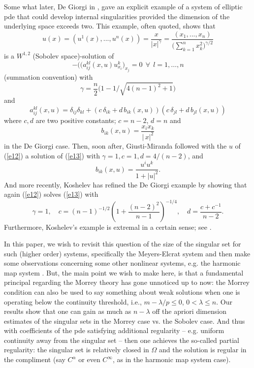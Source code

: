 \documentclass[12pt]{amsart}
\begin{document}
Some what later, De Giorgi in \cite{DG1968}, gave an explicit example of a system of elliptic pde that could develop internal singularities provided the dimension of the underlying space exceeds two. This example, often quoted, shows that
\begin{equation}\label{e12}
u(x)=(u^1(x),...,u^n(x))=\frac{x}{|x|^\gamma}=\frac{(x_1,...,x_n)}{\big(\sum_{k=1}^n x_k^2\big)^{\gamma/2}}
\end{equation}
is a $W^{1,2}$ (Sobolev space)-solution of
\begin{equation}\label{e13}
-\big((a_{ij}^{kl}(x, u) u_{x_i}^{k}\big)_{x_j} = 0\ \ \forall\ \ l = 1,
\ldots, n
\end{equation}
(summation convention) with
$$
\gamma=\frac{n}{2}\Big(1-1/\sqrt{4(n-1)^2+1}\Big)
$$
and
$$
a_{ij}^{kl}(x, u) = \delta_{ij}\delta_{kl} +
  (c\,\delta_{ik} + d \,b_{ik}(x, u))(c\,\delta_{jl} + d\, b_{jl}(x, u))
$$
where $c,d$ are two positive constants; $c=n-2$, $d=n$ and
$$
b_{ik}(x,u) = \frac{x_{i}x_{k}}{|\,x|^2}
$$
in the De Giorgi case. Then, soon after, Giusti-Miranda \cite{GM1968} followed with the $u$ of (\ref{e12}) a solution of (\ref{e13}) with $\gamma=1, c=1, d=4/(n-2)$, and
$$
b_{ik}(x,u) = \frac{u^{i}u^{k}}{1 + |u|^2}.
$$
And more recently, Koshelev \cite{K1995} has refined the De Giorgi example by showing that again (\ref{e12}) solves (\ref{e13}) with
$$
\gamma=1,\quad c=(n-1)^{-1/2}\left(1+\frac{(n-2)^2}{n-1}\right)^{-1/4},\quad d=\frac{c+c^{-1}}{n-2}.
$$
Furthermore, Koshelev's example is extremal in a certain sense; see \cite[Chapter 8]{BF2002}.

In this paper, we  wish to revisit this question of the size of the singular set for such (higher order) systems, specifically the Meyers-Elcrat system \cite{ME1975} and then make some observations concerning some other nonlinear systems, e.g. the harmonic map system \cite{BF2002, LW2008}. But, the main point we wish to make here, is that a fundamental principal regarding the Morrey theory has gone unnoticed up to now: the Morrey condition can also be used to say something about weak solutions when one is operating below the continuity threshold, i.e., $m-{\lambda}/{p}\le 0$, $0<\lambda\le n$. Our results show that one can gain as much as $n-\lambda$ off the apriori dimension estimates of the singular sets in the Morrey case vs. the Sobolev case. And thus with coefficients of the pde satisfying additional regularity -- e.g. uniform continuity away from the singular set -- then one achieves the so-called partial regularity: the singular set is relatively closed in $\Omega$ and the solution is regular in the compliment (say $C^\alpha$ or even $C^\infty$, as in the harmonic map system case).
\end{document}
